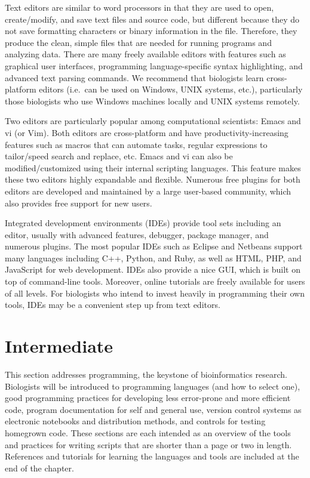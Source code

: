 \documentclass[ChapterTOCs,krantz2]{krantz} %
\newcommand{\unix}{UNIX}
\begin{document}
Text editors are 
similar to word processors in that they are used to open, create/modify, and save text files and source code, but different because they
do not save formatting characters or binary information in the file.
Therefore, they produce the clean, simple files that are needed for running programs
and analyzing data.  There are many freely available editors with features such
as graphical user interfaces, programming language-specific syntax
highlighting, and advanced text parsing commands. 
We recommend that biologists learn cross-platform editors
(i.e.\ can be used on Windows, \unix{} systems, etc.), particularly
those biologists who use Windows machines locally and \unix{} systems
remotely.

Two editors are particularly popular among computational scientists: Emacs and vi (or Vim).
Both editors are cross-platform and have productivity-increasing features 
such as macros that can automate tasks, regular expressions to 
tailor/speed search and replace, etc.
Emacs and vi can also be modified/customized using 
their internal scripting languages.
This feature makes these two editors highly expandable and flexible.
Numerous free plugins for both editors are developed and maintained by a
large user-based community, which also provides free support for new users.

Integrated development environments (IDEs) provide tool sets
including an editor, usually with advanced features, debugger, package manager,
and numerous plugins. The most popular IDEs such as 
Eclipse and Netbeans support many languages including
C++, Python, and Ruby, as well as HTML, PHP, and JavaScript for web
development. IDEs also provide a nice GUI, which is built on
top of command-line tools.  Moreover, 
online tutorials are freely available for users of all levels.  For biologists who 
intend to invest heavily in programming their own tools, IDEs may be a convenient step 
up from text editors.

\section{Intermediate} This section addresses programming, the keystone of
bioinformatics research.  Biologists will be introduced to 
programming languages (and how to select one), good programming practices for
developing less error-prone and more efficient code, program documentation for self and
general use, version control systems as electronic notebooks
and distribution methods, and controls for testing homegrown code.  These
sections are each intended as an overview of the tools and practices for
writing scripts that are shorter than a page or two in length.  References and
tutorials for learning the languages and tools are included at the end of the
chapter. 
\end{document}
